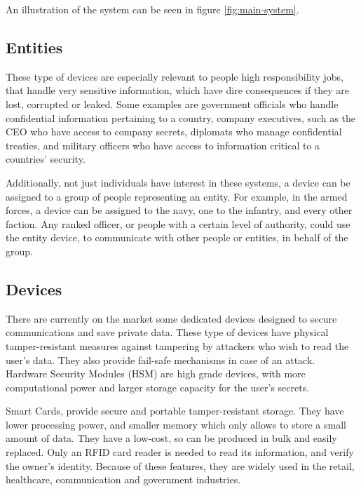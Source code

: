 An illustration of the system can be seen in figure \ref{fig:main-system}.

\subsection{Entities} \label{chap:problem:entities}

These type of devices are especially relevant to people high responsibility jobs, that handle very sensitive information, which have dire consequences if they are lost, corrupted or leaked.
Some examples are government officials who handle confidential information pertaining to a country, company executives, such as the CEO who have access to company secrets, diplomats who manage confidential treaties, and military officers who have access to information critical to a countries' security.

Additionally, not just individuals have interest in these systems, a device can be assigned to a group of people representing an entity. For example, in the armed forces, a device can be assigned to the navy, one to the infantry, and every other faction. Any ranked officer, or people with a certain level of authority, could use the entity device, to communicate with other people or entities, in behalf of the group.

\subsection{Devices} \label{chap:problem:devices}
There are currently on the market some dedicated devices designed to secure communications and save private data.
These type of devices have physical tamper-resistant measures against tampering by attackers who wish to read the user's data. They also provide fail-safe mechanisms in case of an attack.
Hardware Security Modules (HSM) are high grade devices, with more computational power and larger storage capacity for the user's secrets.

Smart Cards, provide secure and portable tamper-resistant storage.
They have lower processing power, and smaller memory which only allows to store a small amount of data.
They have a low-cost, so can be produced in bulk and easily replaced. Only an RFID card reader is needed to read its information, and verify the owner's identity.
Because of these features, they are widely used in the retail, healthcare, communication and government industries.


